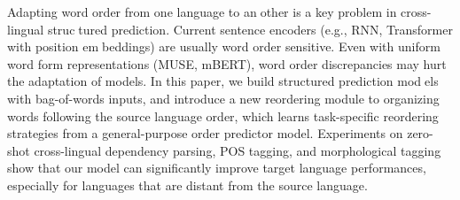 Adapting word order from one language to another is a key problem in cross-lingual structured prediction. Current sentence encoders (e.g., RNN, Transformer with position embeddings) are usually word order sensitive. Even with uniform word form representations (MUSE, mBERT), word order discrepancies may hurt the adaptation of models. In this paper, we build structured prediction models with bag-of-words inputs, and introduce a new reordering module to organizing words following the source language order, which learns task-specific reordering strategies from a general-purpose order predictor model. Experiments on zero-shot cross-lingual dependency parsing, POS tagging, and morphological tagging show that our model can significantly improve target language performances, especially for languages that are distant from the source language.
